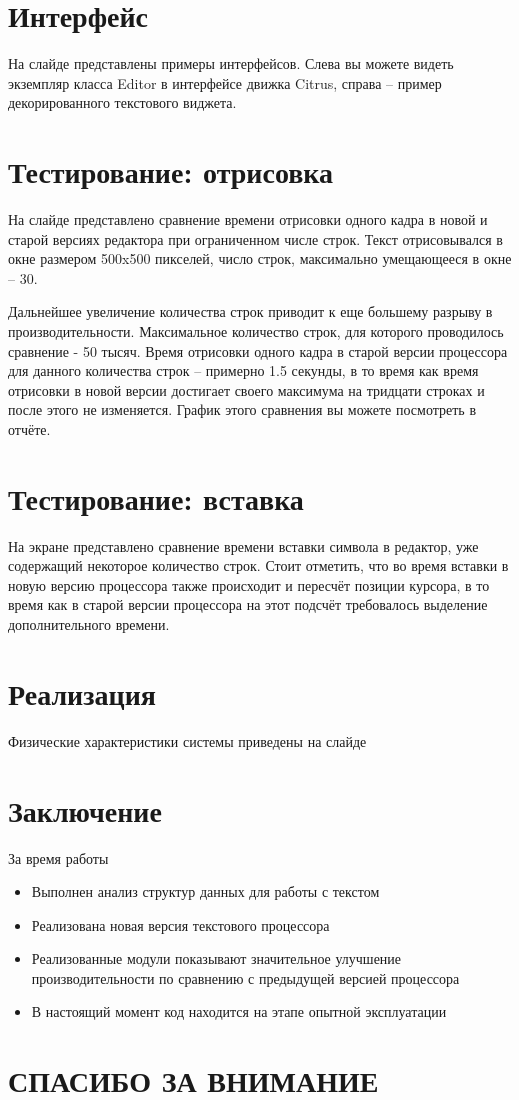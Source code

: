 \documentclass{article}
\begin{document}
    \section{Интерфейс}
        \par На слайде представлены примеры интерфейсов. Слева вы можете видеть экземпляр класса
        Editor в интерфейсе движка Citrus, справа -- пример декорированного текстового виджета.
    \section{Тестирование: отрисовка}
        \par На слайде представлено сравнение времени отрисовки одного кадра в новой и старой
        версиях редактора при ограниченном числе строк. Текст отрисовывался в окне размером
        500x500 пикселей, число строк, максимально умещающееся в окне -- 30.
        \par Дальнейшее увеличение количества строк приводит к еще большему разрыву в
        производительности. Максимальное количество строк, для
        которого проводилось сравнение - 50 тысяч. Время отрисовки одного кадра в старой 
        версии процессора для данного количества строк --
        примерно 1.5 секунды, в то время как время отрисовки в новой версии достигает своего
        максимума на тридцати строках и после этого не изменяется. График этого сравнения вы 
        можете посмотреть в отчёте.
    \section{Тестирование: вставка}
        \par На экране представлено сравнение времени вставки символа в редактор, уже 
        содержащий некоторое количество строк. Стоит отметить, что во время вставки в новую 
        версию процессора также происходит и пересчёт позиции курсора, в то время как в старой 
        версии процессора на этот подсчёт требовалось выделение дополнительного времени.
    \section{Реализация}
        \par Физические характеристики системы приведены на слайде
    \section{Заключение}
    \par За время работы
        \begin{itemize}
            \item Выполнен анализ структур данных для работы с текстом
            \item Реализована новая версия текстового процессора
            \item Реализованные модули показывают значительное улучшение производительности по 
            сравнению с предыдущей версией процессора
            \item В настоящий момент код находится на этапе опытной эксплуатации
        \end{itemize}
    \section{СПАСИБО ЗА ВНИМАНИЕ}
\end{document}
